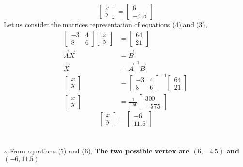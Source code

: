 \documentclass[journal,12pt,twocolumn]{IEEEtran}
\begin{document}
\begin{equation}
\begin{bmatrix}
x \\ y
\end{bmatrix}
=
\begin{bmatrix}
6 \\ -4.5
\end{bmatrix}
\end{equation}
\noindent
Let us consider the matrices representation of equations (4) and (3),
\begin{align*}
\begin{bmatrix}
-3 & 4 \\
8 & 6 
\end{bmatrix}
\begin{bmatrix}
x \\ y
\end{bmatrix}
& =
\begin{bmatrix}
64 \\ 21
\end{bmatrix} \\[6pt]
\vec{A}\vec{X} &=\vec{B} \\[6pt]
\vec{X} &= \vec{A}^{-1}\vec{B} \\[6pt]
\begin{bmatrix}
x \\ y
\end{bmatrix}
& =
\begin{bmatrix}
-3 & 4 \\
8 & 6 
\end{bmatrix}^{-1}
\begin{bmatrix}
64 \\ 21
\end{bmatrix} \\[6pt]
\begin{bmatrix}
x \\ y
\end{bmatrix}
& =
\frac{1}{-50}
\begin{bmatrix}
300 \\ -575
\end{bmatrix}
\end{align*}
\begin{equation}
\begin{bmatrix}
x \\ y
\end{bmatrix}
=
\begin{bmatrix}
-6 \\ 11.5
\end{bmatrix}
\end{equation}
\\\\
\noindent
$\therefore$ From equations (5) and (6), \textbf{The two possible vertex are $(6,-4.5)$ and $(-6,11.5)$}
\end{document}
